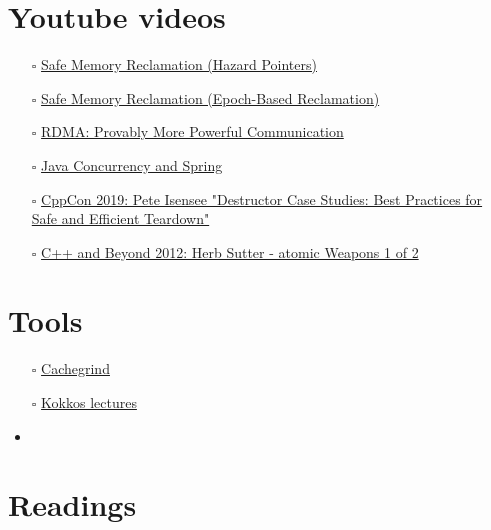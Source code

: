 \documentclass[openany, a4paper]{book}
\theoremstyle{break}
\theoremstyle{example}
\theoremstyle{note}
\theoremstyle{break}
\theoremstyle{exercise}
\begin{document}
\chapter{Youtube videos}
\label{sec:orgf25e9b8}

\begin{itemize}
\item[{$\square$}] \href{https://www.youtube.com/watch?v=drXrIVfBKaQ}{Safe Memory Reclamation (Hazard Pointers)}
\item[{$\square$}] \href{https://www.youtube.com/watch?v=cYDMq5FOiw4}{Safe Memory Reclamation (Epoch-Based Reclamation)}
\item[{$\square$}] \href{https://www.microsoft.com/en-us/research/video/rdma-provably-more-powerful-communication/}{RDMA: Provably More Powerful Communication}
\item[{$\square$}] \href{https://www.youtube.com/watch?v=FYvoBi89wsE}{Java Concurrency and Spring}
\item[{$\square$}] \href{https://www.youtube.com/watch?v=XvWyLAW\_U0Q}{CppCon 2019: Pete Isensee "Destructor Case Studies: Best Practices for
Safe and Efficient Teardown"}
\item[{$\square$}] \href{https://www.youtube.com/watch?app=desktop\&v=A8eCGOqgvH4}{C++ and Beyond 2012: Herb Sutter - atomic Weapons 1 of 2}
\end{itemize}


\chapter{Tools}
\label{sec:org6a9e0b5}

\begin{itemize}
\item[{$\square$}] \href{https://valgrind.org/docs/manual/cg-manual.html}{Cachegrind}
\item[{$\square$}] \href{https://github.com/kokkos/kokkos-tutorials/wiki/Kokkos-Lecture-Series}{Kokkos lectures}
\item
\end{itemize}


\chapter{Readings}
\label{sec:orgc0252e4}
\end{document}
